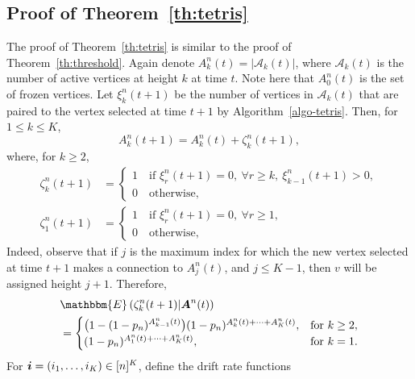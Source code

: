 \documentclass[11pt,a4paper, reqno]{article}
\begin{document}
\subsection{Proof of Theorem~\ref{th:tetris}} The proof of Theorem~\ref{th:tetris} is similar to the proof of Theorem~\ref{th:threshold}. Again denote $A^n_k(t)=|\mathcal{A}_k(t)|$, where $\mathcal{A}_k(t)$ is the number of active vertices at height $k$ at time $t$. Note here that $A^n_0(t)$  is the set of frozen vertices.
Let $\xi_k^n(t+1)$ be the number of vertices in $\mathcal{A}_k(t)$ that are paired to the vertex selected at time $t+1$ by Algorithm~\ref{algo-tetris}.
Then, for $1\leq k\leq K$,
 \begin{equation}
  A_k^n(t+1)=A_k^n(t)+\zeta_k^n(t+1),
 \end{equation}
 where, for $k\geq 2$,
 \begin{equation}
 \begin{split}
  \zeta_k^n(t+1)&=
   \begin{cases}
   1 \quad \text{if } \xi_r^n(t+1)=0, \ \forall r\geq k, \ \xi_{k-1}^n(t+1)>0,\\
   0 \quad  \text{otherwise},
   \end{cases}\\
   \zeta_1^n(t+1)&=
   \begin{cases}1 \quad \text{if } \xi_r^n(t+1)=0, \ \forall r\geq 1,\\
   0 \quad  \text{otherwise},
   \end{cases}
   \end{split}
 \end{equation}
Indeed, observe that if $j$ is the maximum index for which the new vertex selected at time $t+1$ makes a connection to $A_j^n(t)$,  and $j\leq K-1$, then $v$ will be assigned height $j+1$.
Therefore,
\begin{equation}
\begin{split}
 &{\mathbbm{E}\left({\zeta_k^n(t+1)|{\ensuremath{\boldsymbol{{A}}}}^n(t)}\right)}
 \\&=
 \begin{cases}
  \big(1-(1-p_n)^{A_{k-1}^n(t)}\big)(1-p_n)^{A_k^n(t)+\dots+A_{{\scriptscriptstyle} K}^n(t)}, & \text{for } k\geq 2,\\
  (1-p_n)^{A_1^n(t)+\dots+A_K^n(t)},& \text{for } k=1.
 \end{cases}
 \end{split}
\end{equation}
For $\boldsymbol{i}=(i_1,\dots,i_{{\scriptscriptstyle} K})\in[n]^{K}$, define the drift rate functions
\end{document}
